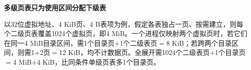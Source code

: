{\color{ink}\bfseries 多级页表只为使用区间分配下级表}\par\vspace{1bp}以32位虚拟地址、4 KiB页、4 B表项为例，假定各表独占一页、按需建立，则每个二级页表覆盖1024个虚拟页，即4 MiB。一个进程仅映射两个虚拟页时，若它们在同一4 MiB目录区间，需1个目录页\(+\allowbreak{}\)1个二级表页\(=\allowbreak{}\)8 KiB；若跨两个目录区间，则需1\(+\allowbreak{}\)2页\(=\allowbreak{}\)12 KiB，均不计数据页。全展开需1024个二级表页\(+\allowbreak{}\)1个目录页\(=\allowbreak{}\)4 MiB\(+\allowbreak{}\)4 KiB，比同条件单级页表多1个目录页。
